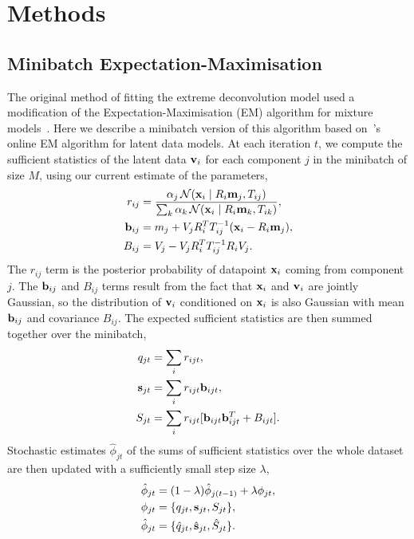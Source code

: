 \section{Methods}

\subsection{Minibatch Expectation-Maximisation}
\label{sec:minibatch-em}
The original method of fitting the extreme deconvolution model used a modification of the Expectation-Maximisation (EM) algorithm for mixture models~\cite{dempsterMaximumLikelihoodIncomplete1977}.
Here we describe a minibatch version of this algorithm based on~\citet{cappeOnlineExpectationMaximization2009}'s online EM algorithm for latent data models.
At each iteration $t$, we compute the sufficient statistics of the latent data $\mathbf{v}_i$ for each component $j$ in the minibatch of size $M$, using our current estimate of the parameters,
\begin{align}
r_{ij} &= \frac{\alpha_{j} \,\mathcal{N}(\mathbf{x}_i \mid R_i\mathbf{m}_j, T_{ij})}{\sum_k \alpha_k \,\mathcal{N}(\mathbf{x}_i \mid R_i\mathbf{m}_k, T_{ik})}, \\ 
\mathbf{b}_{ij} &= m_j + V_j R_i^T T_{ij}^{-1}(\mathbf{x}_i - R_i \mathbf{m}_j), \\
B_{ij} &= V_j - V_j R_i^T T_{ij}^{-1}R_iV_j.
\end{align}
The $r_{ij}$ term is the posterior probability of datapoint $\mathbf{x}_i$ coming from component $j$.
The $\mathbf{b}_{ij}$ and $B_{ij}$ terms result from the fact that $\mathbf{x}_i$ and $\mathbf{v}_i$ are jointly Gaussian, so the distribution of $\mathbf{v}_i$ conditioned on $\mathbf{x}_i$ is also Gaussian with mean $\mathbf{b}_{ij}$ and covariance $B_{ij}$.
The expected sufficient statistics are then summed together over the minibatch,
\begin{align}
q_{jt} &= \sum_i r_{ijt}, \\
\mathbf{s}_{jt} &= \sum_i r_{ijt} \mathbf{b}_{ijt}, \\
S_{jt} &= \sum_i r_{ijt} [\mathbf{b}_{ijt}\mathbf{b}_{ijt}^T + B_{ijt}].
\end{align}
Stochastic estimates $\hat{\phi}_{jt} $ of the sums of sufficient statistics over the whole dataset are then updated with a sufficiently small step size $\lambda$,
\begin{align}
\hat{\phi}_{jt} &= (1 - \lambda)\hat{\phi}_{j(t-1)} + \lambda \phi_{jt},\\
\phi_{jt} &= \{q_{jt}, \mathbf{s}_{jt}, S_{jt} \},\\
\hat{\phi}_{jt} &= \{\hat{q}_{jt}, \hat{\mathbf{s}}_{jt}, \hat{S}_{jt} \}. \label{eq:sums}
\end{align}
